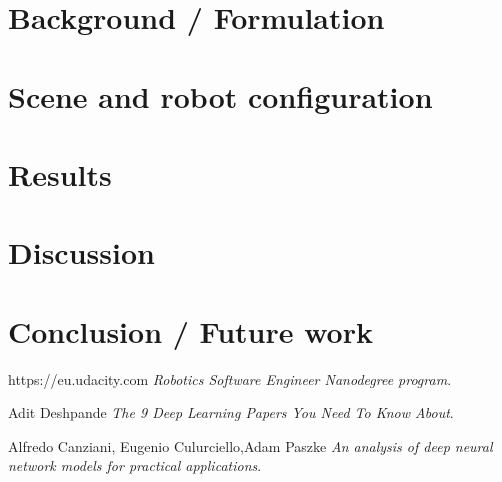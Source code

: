 \documentclass[10pt,journal,compsoc]{IEEEtran}
\begin{document}
\section{Background / Formulation}
\section{Scene and robot configuration}
\section{Results}
\section{Discussion}
\section{Conclusion / Future work}

\begin{thebibliography}{9}


https://eu.udacity.com
\textit{Robotics Software Engineer Nanodegree program}. 

Adit Deshpande
\textit{The 9 Deep Learning Papers You Need To Know About}. 

Alfredo Canziani, Eugenio Culurciello,Adam Paszke  
\textit{An analysis of deep neural network models for practical applications}. 
\end{thebibliography}
\end{document}
